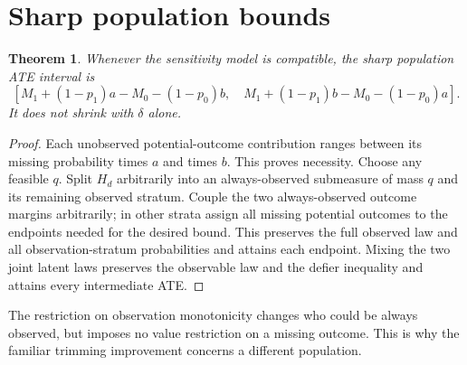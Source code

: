 \documentclass[11pt,a4paper]{article}
\newtheorem{theorem}{Theorem}[section]
\begin{document}
\section{Sharp population bounds}
\begin{theorem}
Whenever the sensitivity model is compatible, the sharp population ATE interval is
\[
 \left[M_1+(1-p_1)a-M_0-(1-p_0)b,\quad
 M_1+(1-p_1)b-M_0-(1-p_0)a\right].         \tag{2}
\]
It does not shrink with $\delta$ alone.
\end{theorem}
\begin{proof}
Each unobserved potential-outcome contribution ranges between its missing probability times $a$ and times $b$. This proves necessity. Choose any feasible $q$. Split $H_d$ arbitrarily into an always-observed submeasure of mass $q$ and its remaining observed stratum. Couple the two always-observed outcome margins arbitrarily; in other strata assign all missing potential outcomes to the endpoints needed for the desired bound. This preserves the full observed law and all observation-stratum probabilities and attains each endpoint. Mixing the two joint latent laws preserves the observable law and the defier inequality and attains every intermediate ATE.
\end{proof}
The restriction on observation monotonicity changes who could be always observed, but imposes no value restriction on a missing outcome. This is why the familiar trimming improvement concerns a different population.
\end{document}
